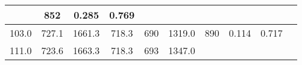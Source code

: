 \documentclass[a4paper,10pt]{article}
\begin{document}
\begin{longtable}{
     |
%    
    c|
%    
    c|
%    
    c|
%    
    c|
%    
    c|
%    
    c|
%    
    c|
%    
    c|
%    
    c|
%    
    c|
%    
    }
%        
        & 852
%        

%        

%        
        & 0.285
%        

%        

%        
        & 0.769
%        

%        
        \\
        \hline

        

%        

%        
        103.0
%        

%        

%        
        & 727.1
%        

%        

%        
        & 1661.3
%        

%        

%        
        & 718.3
%        

%        

%        
        & 690
%        

%        

%        
        & 1319.0
%        

%        

%        
        & 890
%        

%        

%        
        & 0.114
%        

%        

%        
        & 0.717
%        

%        
        \\
        \hline

        

%        

%        
        111.0
%        

%        

%        
        & 723.6
%        

%        

%        
        & 1663.3
%        

%        

%        
        & 718.3
%        

%        

%        
        & 693
%        

%        

%        
        & 1347.0
%        

%        


\end{longtable}
\end{document}
